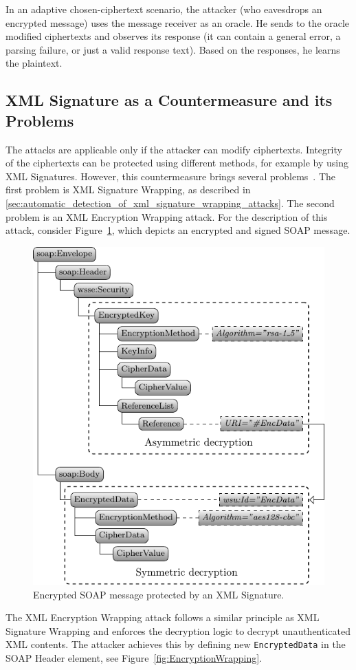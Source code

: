 In an adaptive chosen-ciphertext scenario, the attacker (who eavesdrops an encrypted message) uses the message receiver as an oracle. He sends to the oracle modified ciphertexts and observes its response (it can contain a general error, a parsing failure, or just a valid response text). Based on the responses, he learns the plaintext.


\subsection[XML Signature as a Countermeasure]{XML Signature as a Countermeasure and its Problems}
The attacks are applicable only if the attacker can modify ciphertexts. Integrity of the ciphertexts can be protected using different methods, for example by using XML Signatures. However, this countermeasure brings several problems~\cite{SoSchXMLenc2012}. The first problem is XML Signature Wrapping, as described in \ref{sec:automatic_detection_of_xml_signature_wrapping_attacks}. The second problem is an XML Encryption Wrapping attack. For the description of this attack, consider Figure~\ref{fig:signedEncryptedSoap}, which depicts an encrypted and signed SOAP message.

\begin{figure}[!ht]
    \centering
    \includegraphics[width=0.55\linewidth]{img/soap_encrypted_signed}
    \caption{Encrypted SOAP message protected by an XML Signature.}
    \label{fig:signedEncryptedSoap}
\end{figure}

The XML Encryption Wrapping attack follows a similar principle as XML Signature Wrapping and enforces the decryption logic to decrypt unauthenticated XML contents. The attacker achieves this by defining new \texttt{EncryptedData} in the SOAP Header element, see Figure~\ref{fig:EncryptionWrapping}.

